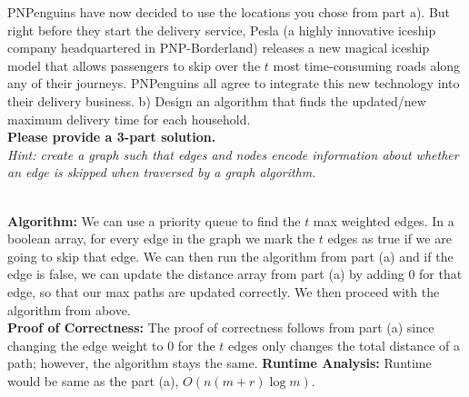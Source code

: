 \documentclass[10.5pt]{article}
\begin{document}
\newpage
PNPenguins have now decided to use the locations you chose from part a). But right before they start the delivery service, Pesla (a highly innovative iceship company headquartered in PNP-Borderland) releases a new magical iceship model that allows passengers to skip over the $t$ most time-consuming roads along any of their journeys. PNPenguins all agree to integrate this new technology into their delivery business.
\newline
\newline
b) Design an algorithm that finds the updated/new maximum delivery time for each household.\\
\textbf{Please provide a 3-part solution.}\\
\emph{Hint: create a graph such that edges and nodes encode information about whether an edge is skipped when traversed by a graph algorithm.}\\
\begin{solution}\\
  \textbf{Algorithm:} We can use a priority queue to find the $t$ max weighted edges. In a boolean array, for every edge in the graph we mark the $t$ edges as true if we are going to skip that edge.
  We can then run the algorithm from part (a) and if the edge is false, we can update the distance array from part (a) by adding 0 for that edge, so that our max paths are updated correctly. We then proceed with the algorithm from above.\\
  \textbf{Proof of Correctness:} The proof of correctness follows from part (a) since changing the edge weight to 0 for the $t$ edges only changes the total distance of a path; however, the algorithm stays the same.
  \textbf{Runtime Analysis:} Runtime would be same as the part (a), $O(n(m + r)\log m)$.
\end{solution}
\newpage
{}
\end{document}
